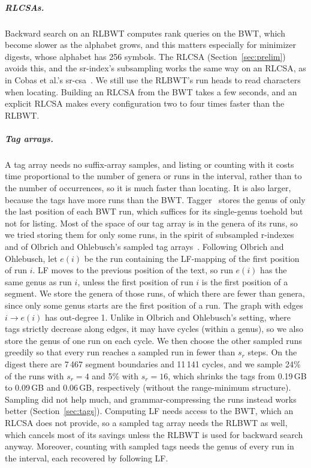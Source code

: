 \subparagraph*{RLCSAs.}
Backward search on an RLBWT computes rank queries on the BWT, which become slower as the alphabet grows, and this matters especially for minimizer digests, whose alphabet has 256 symbols.
The RLCSA (Section~\ref{sec:prelim}) avoids this, and the sr-index's subsampling works the same way on an RLCSA, as in Cobas et al.'s sr-csa~\cite{CGN25}.
We still use the RLBWT's run heads to read characters when locating.
Building an RLCSA from the BWT takes a few seconds, and an explicit RLCSA makes every configuration two to four times faster than the RLBWT.

\subparagraph*{Tag arrays.}
A tag array needs no suffix-array samples, and listing or counting with it costs time proportional to the number of genera or runs in the interval, rather than to the number of occurrences, so it is much faster than locating.
It is also larger, because the tags have more runs than the BWT.
Tagger~\cite{DAF+25} stores the genus of only the last position of each BWT run, which suffices for its single-genus toehold but not for listing.
Most of the space of our tag array is in the genera of its runs, so we tried storing them for only some runs, in the spirit of subsampled r-indexes~\cite{CGN25} and of Olbrich and Ohlebusch's sampled tag arrays~\cite{OO26}.
Following Olbrich and Ohlebusch, let $e(i)$ be the run containing the LF-mapping of the first position of run $i$.
LF moves to the previous position of the text, so run $e(i)$ has the same genus as run $i$, unless the first position of run $i$ is the first position of a segment.
We store the genera of those runs, of which there are fewer than genera, since only some genus starts are the first position of a run.
The graph with edges $i \to e(i)$ has out-degree 1.
Unlike in Olbrich and Ohlebusch's setting, where tags strictly decrease along edges, it may have cycles (within a genus), so we also store the genus of one run on each cycle.
We then choose the other sampled runs greedily so that every run reaches a sampled run in fewer than $s_r$ steps.
On the digest there are 7\,467 segment boundaries and 11\,141 cycles, and we sample 24\% of the runs with $s_r = 4$ and 5\% with $s_r = 16$, which shrinks the tags from 0.19\,GB to 0.09\,GB and 0.06\,GB, respectively (without the range-minimum structure).
Sampling did not help much, and grammar-compressing the runs instead works better (Section~\ref{sec:tags}).
Computing LF needs access to the BWT, which an RLCSA does not provide, so a sampled tag array needs the RLBWT as well, which cancels most of its savings unless the RLBWT is used for backward search anyway.
Moreover, counting with sampled tags needs the genus of every run in the interval, each recovered by following LF.

